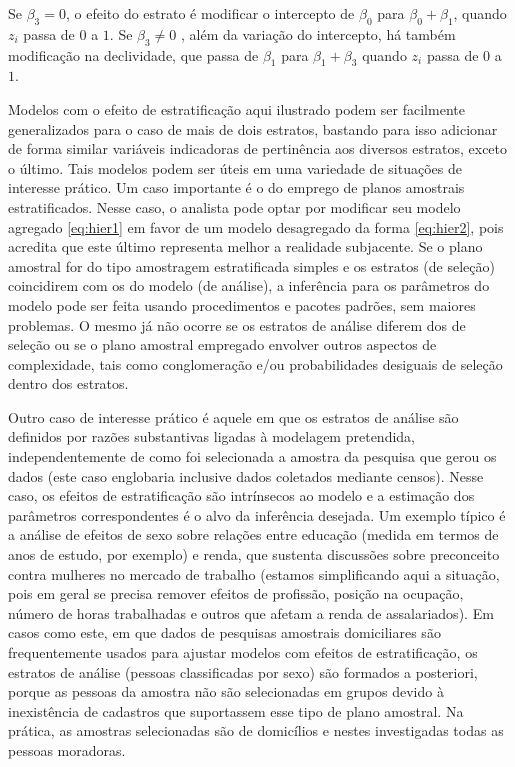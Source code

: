 \documentclass[]{book}
\theoremstyle{definition}
\theoremstyle{definition}
\theoremstyle{definition}
\theoremstyle{remark}
\begin{document}
Se \(\beta _{3}=0\), o efeito do estrato é modificar o intercepto de
\(\beta _{0}\) para \(\beta _{0}+\beta _{1}\), quando \(z_{i}\) passa de
\(0\) a \(1\). Se \(\beta _{3}\neq 0\) , além da variação do intercepto,
há também modificação na declividade, que passa de \(\beta _{1}\) para
\(\beta _{1}+\beta _{3}\) quando \(z_{i}\) passa de \(0\) a \(1\).

Modelos com o efeito de estratificação aqui ilustrado podem ser
facilmente generalizados para o caso de mais de dois estratos, bastando
para isso adicionar de forma similar variáveis indicadoras de
pertinência aos diversos estratos, exceto o último. Tais modelos podem
ser úteis em uma variedade de situações de interesse prático. Um caso
importante é o do emprego de planos amostrais estratificados. Nesse
caso, o analista pode optar por modificar seu modelo agregado
\eqref{eq:hier1} em favor de um modelo desagregado da forma
\eqref{eq:hier2}, pois acredita que este último representa melhor a
realidade subjacente. Se o plano amostral for do tipo amostragem
estratificada simples e os estratos (de seleção) coincidirem com os do
modelo (de análise), a inferência para os parâmetros do modelo pode ser
feita usando procedimentos e pacotes padrões, sem maiores problemas. O
mesmo já não ocorre se os estratos de análise diferem dos de seleção ou
se o plano amostral empregado envolver outros aspectos de complexidade,
tais como conglomeração e/ou probabilidades desiguais de seleção dentro
dos estratos.

Outro caso de interesse prático é aquele em que os estratos de análise
são definidos por razões substantivas ligadas à modelagem pretendida,
independentemente de como foi selecionada a amostra da pesquisa que
gerou os dados (este caso englobaria inclusive dados coletados mediante
censos). Nesse caso, os efeitos de estratificação são intrínsecos ao
modelo e a estimação dos parâmetros correspondentes é o alvo da
inferência desejada. Um exemplo típico é a análise de efeitos de sexo
sobre relações entre educação (medida em termos de anos de estudo, por
exemplo) e renda, que sustenta discussões sobre preconceito contra
mulheres no mercado de trabalho (estamos simplificando aqui a situação,
pois em geral se precisa remover efeitos de profissão, posição na
ocupação, número de horas trabalhadas e outros que afetam a renda de
assalariados). Em casos como este, em que dados de pesquisas amostrais
domiciliares são frequentemente usados para ajustar modelos com efeitos
de estratificação, os estratos de análise (pessoas classificadas por
sexo) são formados a posteriori, porque as pessoas da amostra não são
selecionadas em grupos devido à inexistência de cadastros que
suportassem esse tipo de plano amostral. Na prática, as amostras
selecionadas são de domicílios e nestes investigadas todas as pessoas
moradoras.
\end{document}
